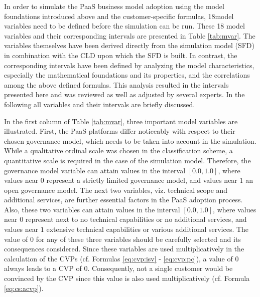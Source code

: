 In order to simulate the \ac{PaaS} business model adoption using the model foundations introduced above and the customer-specific formulas, 18\linebreak model variables need to be defined before the simulation can be run. These 18 model variables and their corresponding intervals are presented in Table \ref{tab:mvar}. The variables themselves have been derived directly from the simulation model (\ac{SFD}) in combination with the \ac{CLD} upon which the \ac{SFD} is built. In contrast, the corresponding intervals have been defined by analyzing the model characteristics, especially the mathematical foundations and its properties, and the correlations among the above defined formulas. This analysis resulted in the intervals presented here and was reviewed as well as adjusted by several experts. In the following all variables and their intervals are briefly discussed.

In the first column of Table \ref{tab:mvar}, three important model variables are illustrated. First, the \ac{PaaS} platforms differ noticeably with respect to their chosen governance model, which needs to be taken into account in the simulation. While a qualitative ordinal scale was chosen in the classification scheme, a quantitative scale is required in the case of the simulation model. Therefore, the governance model variable can attain values in the interval $[0.0,1.0]$, where values near $0$ represent a strictly limited governance model, and values near $1$ an open governance model. The next two variables, viz. technical scope and additional services, are further essential factors in the \ac{PaaS} adoption process. Also, these two variables can attain values in the interval $[0.0,1.0]$, where values near $0$ represent next to no technical capabilities or no additional services, and values near $1$ extensive technical capabilities or various additional services. The value of $0$ for any of these three variables should be carefully selected and its consequences considered. Since these variables are used multiplicatively in the calculation of the \acp{CVP} (cf. Formulas \ref{eq:cvp:isv} - \ref{eq:cvp:pc}), a value of $0$ always leads to a \ac{CVP} of $0$. Consequently, not a single customer would be convinced by the \ac{CVP} since this value is also used multiplicatively (cf. Formula \ref{eq:cs:acvp}).

\newlength{\originalTabcolsep}
\setlength{\originalTabcolsep}{\tabcolsep}
\setlength{\tabcolsep}{1.5mm}

